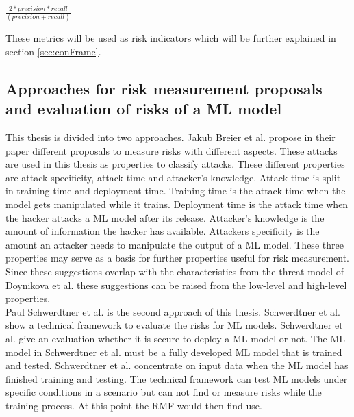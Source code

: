 \begin{center}
  $\frac{2 * precision * recall}{(precision + recall)}$
\end{center}

These metrics will be used as risk indicators which will be further explained in section \ref{sec:conFrame}.

\subsection{Approaches for risk measurement proposals and evaluation of risks of a ML model}
\label{sec:approaches}

This thesis is divided into two approaches. Jakub Breier et al. \cite{DBLP:journals/corr/abs-2012-04884} propose in their paper different proposals to measure risks with different
aspects. These attacks are used in this thesis as properties to classify attacks. These different properties are attack specificity, attack time and attacker's knowledge. Attack time is
split in training time and deployment time. Training time is the attack time when the model gets manipulated while it trains. Deployment time is the attack time when the hacker attacks a
ML model after its release. Attacker's knowledge is the amount of information the hacker has available. Attackers specificity is the amount an attacker needs to manipulate the output of a
ML model. These three properties may serve as a basis for further properties useful for risk measurement. Since these suggestions overlap with the characteristics from the threat model of Doynikova et al. these suggestions can be raised from the low-level and high-level properties.\\
Paul Schwerdtner et al. \cite{DBLP:journals/corr/abs-2011-04328} is the second approach of this thesis. Schwerdtner et al. show a technical framework to evaluate the risks for ML models.
Schwerdtner et al. give an evaluation whether it is secure to deploy a ML model or not. The ML model in Schwerdtner et al. must be a fully developed ML model that is trained and tested.
Schwerdtner et al. concentrate on input data when the ML model has finished training and testing. The technical framework can test ML models under specific conditions in a scenario but can not find or measure risks while the training process. At this point the RMF would then find use.\\
